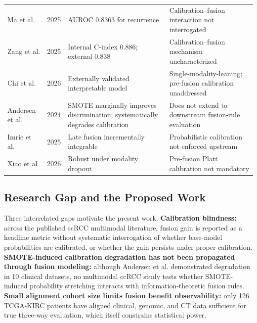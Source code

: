 \begin{table}[t]
\begin{tabularx}{\textwidth}{@{} p{} p{} L L @{}}
Ma et al. & 2025 & AUROC 0.8363 for recurrence & Calibration--fusion interaction not interrogated \\ \addlinespace
Zang et al. & 2025 & Internal C-index 0.886; external 0.838 & Calibration--fusion mechanism uncharacterized \\ \addlinespace
Chi et al. & 2026 & Externally validated interpretable model & Single-modality-leaning; pre-fusion calibration unaddressed \\ \addlinespace
Andersen et al. & 2024 & SMOTE marginally improves discrimination; systematically degrades calibration & Does not extend to downstream fusion-rule evaluation \\ \addlinespace
Imrie et al. & 2025 & Late fusion incrementally integrable & Probabilistic calibration not enforced upstream \\ \addlinespace
Xiao et al. & 2026 & Robust under modality dropout & Pre-fusion Platt calibration not mandatory \\
\bottomrule
\end{tabularx}
\end{table}

\subsection{Research Gap and the Proposed Work}
Three interrelated gaps motivate the present work. \textbf{Calibration blindness:} across the published ccRCC multimodal literature, fusion gain is reported as a headline metric without systematic interrogation of whether base-model probabilities are calibrated, or whether the gain persists under proper calibration. \textbf{SMOTE-induced calibration degradation has not been propagated through fusion modeling:} although Andersen et al. \cite{andersen2024impact} demonstrated degradation in 10 clinical datasets, no multimodal ccRCC study tests whether SMOTE-induced probability stretching interacts with information-theoretic fusion rules. \textbf{Small alignment cohort size limits fusion benefit observability:} only 126 TCGA-KIRC patients have aligned clinical, genomic, and CT data sufficient for true three-way evaluation, which itself constrains statistical power.

